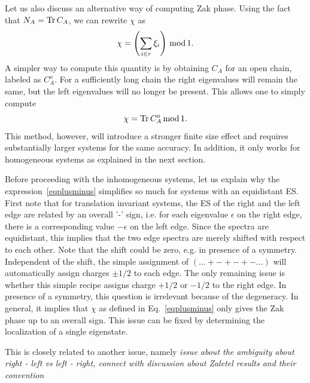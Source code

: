 \documentclass[twocolumn,amsmath,longbibliography,amssymb,superscriptaddress]{revtex4-1}
\newcommand{\mariac}[1]{{\it\color{cyan}#1}}
\begin{document}
Let us also discuss an alternative way of computing Zak phase. 
Using the fact that $N_A = \Tr C_A$, we can rewrite $\chi$ as
\begin{equation}
\chi = \left(\sum_{i\in r} \xi_i\right) \, {\rm mod} \, 1.
\label{eq:chihom}
\end{equation}
A simpler way to compute this quantity is by obtaining $C_A$ for an open chain, labeled as $C_A^{ o}$. 
For a sufficiently long  chain the right eigenvalues will remain the same, %
but the left eigenvalues will no longer be present. 
This allows one to simply compute
\begin{equation}
\chi = \Tr C_A^{o} \, {\rm mod} \, 1.
\end{equation}
This method, however, will introduce a stronger finite size effect and requires substantially larger systems for the same accuracy. 
In addition, it only works for homogeneous systems as explained in the next section. 


Before proceeding with the inhomogeneous systems, let us explain why the expression~\eqref{eqplusminus} simplifies so much for systems with an equidistant ES. 
First note that for translation invariant systems, the ES of the right and the left edge are related by an overall '-' sign, i.e. for each eigenvalue $\epsilon$ on the right edge, there is a corresponding value $-\epsilon$ on the left edge. 
Since the spectra are equidistant, this implies that the two edge spectra are merely shifted with respect to each other.
Note that  the shift could be zero, e.g.  in presence of a symmetry. 
Independent of the shift, the simple assignment of $ (...+-+-+-...)$ will automatically assign charges $\pm 1/2$ to each edge. 
The only remaining issue is whether this simple recipe assigns charge $+1/2$ or $-1/2$ to the right edge.
In presence of a symmetry, this question is irrelevant because of the degeneracy. 
In general, it implies that $\chi$ as defined in Eq.~\eqref{eqplusminus} only gives the Zak phase up to an overall sign. 
This issue can be fixed by determining the localization of a single eigenstate. 

This is closely related to another issue, namely \mariac{issue about  the ambiguity about right - left vs left - right, connect with discussion about Zaletel results and their convention}

\end{document}
